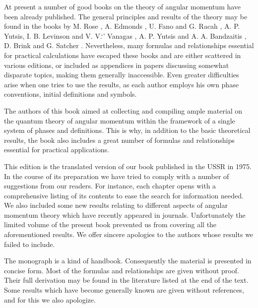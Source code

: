 At present a number of good books on the theory of angular momentum have been already published. The general principles and results of the theory may be found in the books by M. Rose \cite{ref031}, A. Edmonds \cite{ref016}, U. Fano and G. Racah \cite{ref018}, A. P. Yutsis, I. B. Levinson and V. V.`' Vanagas \cite{ref044}, A. P. Yutsis and A. A. Bandzaitis \cite{ref045}, D. Brink and G. Satcher \cite{ref009}. Nevertheless, many formulas and relationships essential for practical calculations have escaped these books and are either scattered in various editions, or included as appendices in papers discussing somewhat disparate topics, making them generally inaccessible. Even greater difficulties arise when one tries to use the results, as each author employs his own phase conventions, initial definitions and symbols.

The authors of this book aimed at collecting and compiling ample material on the quantum theory of angular momentum within the framework of a single system of phases and definitions. This is why, in addition to the basic theoretical results, the book also includes a great number of formulas and relationships essential for practical applications.

This edition is the translated version of our book published in the USSR in 1975. In the course of its preparation we have tried to comply with a number of suggestions from our readers. For instance, each chapter opens with a comprehensive listing of its contents to ease the search for information needed. We also included some new results relating to different aspects of angular momentum theory which have recently appeared in journals. Unfortunately the limited volume of the present book prevented us from covering all the aforementioned results. We offer sincere apologies to the authors whose results we failed to include.

The monograph is a kind of handbook. Consequently the material is presented in concise form. Most of the formulas and relationships are given without proof. Their full derivation may be found in the literature
listed at the end of the text. Some results which have become generally known are given without references, and for this we also apologize.


